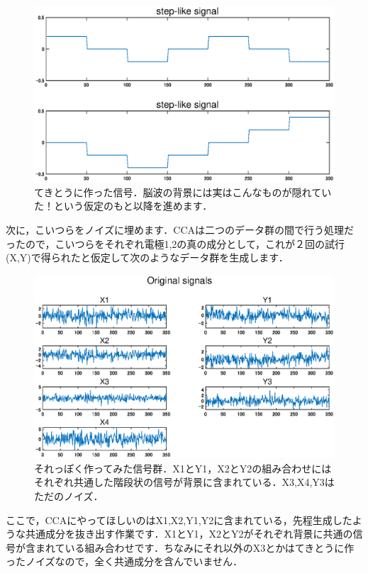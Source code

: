 \documentclass[11pt,a4paper,uplatex]{ujreport}
\begin{document}
\begin{figure}[H]
  \includegraphics[width=15cm]{../figures/CCA1.eps}
  \caption{てきとうに作った信号．脳波の背景には実はこんなものが隠れていた！という仮定のもと以降を進めます．}
\end{figure}

次に，こいつらをノイズに埋めます．CCAは二つのデータ群の間で行う処理だったので，こいつらをそれぞれ電極1,2の真の成分として，これが２回の試行(X,Y)で得られたと仮定して次のようなデータ群を生成します．

\begin{figure}[H]
  \includegraphics[width=15cm]{../figures/CCA2.eps}
  \caption{それっぽく作ってみた信号群．X1とY1，X2とY2の組み合わせにはそれぞれ共通した階段状の信号が背景に含まれている．X3,X4,Y3はただのノイズ．}
\end{figure}

ここで，CCAにやってほしいのはX1,X2,Y1,Y2に含まれている，先程生成したような共通成分を抜き出す作業です．X1とY1，X2とY2がそれぞれ背景に共通の信号が含まれている組み合わせです．ちなみにそれ以外のX3とかはてきとうに作ったノイズなので，全く共通成分を含んでいません．\\\\
\end{document}
